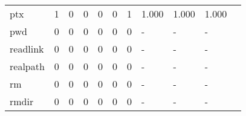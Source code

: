 \begin{longtable}{lp{1.2cm}p{1.2cm}p{1.2cm}p{1.2cm}p{1.2cm}p{1.2cm}p{1.2cm}p{1.2cm}p{1.2cm}p{1.2cm}}
ptx       &                                     1 &                                                  0 &                                                  0 &                                                  0 &                                                  0 &                                                  1 &                                         1.000 &                                              1.000 &                                              1.000 \\
pwd       &                                     0 &                                                  0 &                                                  0 &                                                  0 &                                                  0 &                                                  0 &                                             - &                                                  - &                                                  - \\
readlink  &                                     0 &                                                  0 &                                                  0 &                                                  0 &                                                  0 &                                                  0 &                                             - &                                                  - &                                                  - \\
realpath  &                                     0 &                                                  0 &                                                  0 &                                                  0 &                                                  0 &                                                  0 &                                             - &                                                  - &                                                  - \\
rm        &                                     0 &                                                  0 &                                                  0 &                                                  0 &                                                  0 &                                                  0 &                                             - &                                                  - &                                                  - \\
rmdir     &                                     0 &                                                  0 &                                                  0 &                                                  0 &                                                  0 &                                                  0 &                                             - &                                                  - &                                                  - \\

\end{longtable}
